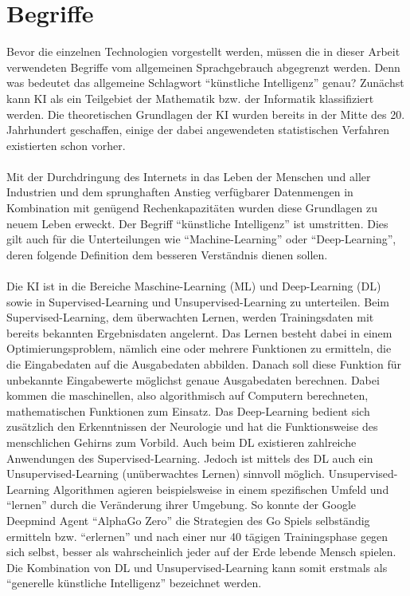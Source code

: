 \documentclass[a4paper]{scrreprt}
\begin{document}
\section{Begriffe}
Bevor die einzelnen Technologien vorgestellt werden, müssen die in dieser Arbeit verwendeten Begriffe vom allgemeinen Sprachgebrauch abgegrenzt werden. Denn was bedeutet das allgemeine Schlagwort ``künstliche Intelligenz'' genau? Zunächst kann KI als ein Teilgebiet der Mathematik bzw. der Informatik klassifiziert werden. Die theoretischen Grundlagen der KI wurden bereits in der Mitte des 20. Jahrhundert geschaffen, einige der dabei angewendeten statistischen Verfahren existierten schon vorher.
\\\\
Mit der Durchdringung des Internets in das Leben der Menschen und aller Industrien und dem sprunghaften Anstieg verfügbarer Datenmengen in Kombination mit genügend Rechenkapazitäten wurden diese Grundlagen zu neuem Leben erweckt. Der Begriff ``künstliche Intelligenz'' ist umstritten. Dies gilt auch für die Unterteilungen wie ``Machine-Learning'' oder ``Deep-Learning'', deren folgende Definition dem besseren Verständnis dienen sollen.\\\\
Die KI ist in die Bereiche Maschine-Learning (ML) und Deep-Learning (DL) sowie in Supervised-Learning und Unsupervised-Learning zu unterteilen. Beim Supervised-Learning, dem überwachten Lernen, werden Trainingsdaten mit bereits bekannten Ergebnisdaten angelernt. Das Lernen besteht dabei in einem Optimierungsproblem, nämlich eine oder mehrere Funktionen zu ermitteln, die die Eingabedaten auf die Ausgabedaten abbilden. Danach soll diese Funktion für unbekannte Eingabewerte möglichst genaue Ausgabedaten berechnen. Dabei kommen die maschinellen, also algorithmisch auf Computern berechneten, mathematischen Funktionen zum Einsatz. Das Deep-Learning bedient sich zusätzlich den Erkenntnissen der Neurologie und hat die Funktionsweise des menschlichen Gehirns zum Vorbild. Auch beim DL existieren zahlreiche Anwendungen des Supervised-Learning. Jedoch ist mittels des DL auch ein Unsupervised-Learning (unüberwachtes Lernen) sinnvoll möglich. Unsupervised-Learning Algorithmen agieren beispielsweise in einem spezifischen Umfeld und ``lernen'' durch die Veränderung ihrer Umgebung. So konnte der Google Deepmind Agent ``AlphaGo Zero'' die Strategien des Go Spiels selbständig ermitteln bzw. ``erlernen'' und nach einer nur 40 tägigen Trainingsphase gegen sich selbst, besser als wahrscheinlich jeder auf der Erde lebende Mensch spielen. Die Kombination von DL und Unsupervised-Learning kann somit erstmals als ``generelle künstliche Intelligenz'' bezeichnet werden. 
\newpage
\end{document}
